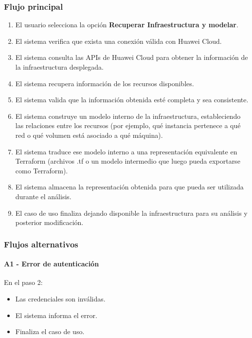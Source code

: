 \subsubsection*{Flujo principal}

\begin{enumerate}
\item El usuario selecciona la opción \textbf{Recuperar Infraestructura y modelar}.
\item El sistema verifica que exista una conexión válida con Huawei Cloud.
\item El sistema consulta las APIs de Huawei Cloud para obtener la información de la infraestructura desplegada.
\item El sistema recupera información de los recursos disponibles.
\item El sistema valida que la información obtenida esté completa y sea consistente.
\item El sistema construye un modelo interno de la infraestructura, estableciendo las relaciones entre los recursos (por ejemplo, qué instancia pertenece a qué red o qué volumen está asociado a qué máquina).
\item El sistema traduce ese modelo interno a una representación equivalente en Terraform (archivos .tf o un modelo intermedio que luego pueda exportarse como Terraform).
\item El sistema almacena la representación obtenida para que pueda ser utilizada durante el análisis.
\item El caso de uso finaliza dejando disponible la infraestructura para su análisis y posterior modificación.
\end{enumerate}

\subsubsection*{Flujos alternativos}

\paragraph{A1 - Error de autenticación}

En el paso 2:

\begin{itemize}
\item Las credenciales son inválidas.
\item El sistema informa el error.
\item Finaliza el caso de uso.
\end{itemize}

